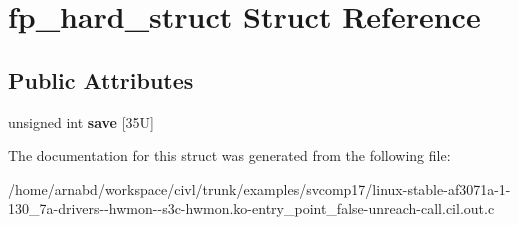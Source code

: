 \hypertarget{structfp__hard__struct}{}\section{fp\+\_\+hard\+\_\+struct Struct Reference}
\label{structfp__hard__struct}
\subsection*{Public Attributes}
\begin{DoxyCompactItemize}
\item 
\hypertarget{structfp__hard__struct_a9c410f84501562bc0be1a8ffb0cea236}{}unsigned int {\bfseries save} \mbox{[}35\+U\mbox{]}\label{structfp__hard__struct_a9c410f84501562bc0be1a8ffb0cea236}

\end{DoxyCompactItemize}


The documentation for this struct was generated from the following file\+:\begin{DoxyCompactItemize}
\item 
/home/arnabd/workspace/civl/trunk/examples/svcomp17/linux-\/stable-\/af3071a-\/1-\/130\+\_\+7a-\/drivers-\/-\/hwmon-\/-\/s3c-\/hwmon.\+ko-\/entry\+\_\+point\+\_\+false-\/unreach-\/call.\+cil.\+out.\+c\end{DoxyCompactItemize}
